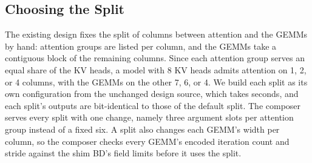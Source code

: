 \subsection{Choosing the Split}
\label{subsec:split}

The existing design fixes the split of columns between attention and the GEMMs by hand: attention groups are listed per column, and the GEMMs take a contiguous block of the remaining columns.
Since each attention group serves an equal share of the KV heads, a model with 8 KV heads admits attention on 1, 2, or 4 columns, with the GEMMs on the other 7, 6, or 4.
We build each split as its own configuration from the unchanged design source, which takes seconds, and each split's outputs are bit-identical to those of the default split.
The composer serves every split with one change, namely three argument slots per attention group instead of a fixed six.
A split also changes each GEMM's width per column, so the composer checks every GEMM's encoded iteration count and stride against the shim BD's field limits before it uses the split.

